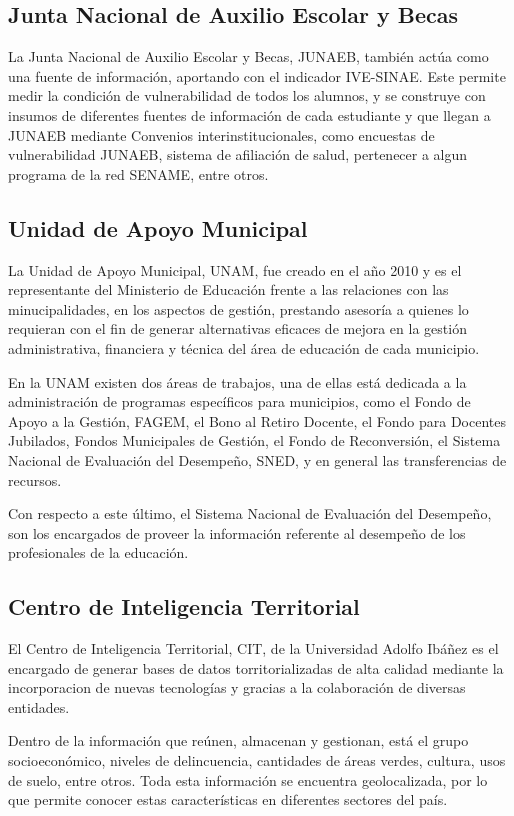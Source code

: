 \subsection{Junta Nacional de Auxilio Escolar y Becas}
La Junta Nacional de Auxilio Escolar y Becas, JUNAEB, también actúa como una fuente de información, aportando con el indicador IVE-SINAE. Este permite medir la condición de vulnerabilidad de todos los alumnos, y se construye con insumos de diferentes fuentes de información de cada estudiante y que llegan a JUNAEB mediante Convenios interinstitucionales, como encuestas de vulnerabilidad JUNAEB, sistema de afiliación de salud, pertenecer a algun programa de la red SENAME, entre otros. 

\subsection{Unidad de Apoyo Municipal}
La Unidad de Apoyo Municipal, UNAM, fue creado en el año 2010 y es el representante del Ministerio de Educación frente a las relaciones con las minucipalidades, en los aspectos de gestión, prestando asesoría a quienes lo requieran con el fin de generar alternativas eficaces de mejora en la gestión administrativa, financiera y técnica del área de educación de cada municipio.

En la UNAM existen dos áreas de trabajos, una de ellas está dedicada a la administración de programas específicos para municipios, como el Fondo de Apoyo a la Gestión, FAGEM, el Bono al Retiro Docente, el Fondo para Docentes Jubilados, Fondos Municipales de Gestión, el Fondo de Reconversión, el Sistema Nacional de Evaluación del Desempeño, SNED, y en general las transferencias de recursos.  

Con respecto a este último, el Sistema Nacional de Evaluación del Desempeño, son los encargados de proveer la información referente al desempeño de los profesionales de la educación. 

\subsection{Centro de Inteligencia Territorial}
El Centro de Inteligencia Territorial, CIT, de la Universidad Adolfo Ibáñez es el encargado de generar bases de datos torritorializadas de alta calidad mediante la incorporacion de nuevas tecnologías y gracias a la colaboración de diversas entidades. 

Dentro de la información que reúnen, almacenan y gestionan, está el grupo socioeconómico, niveles de delincuencia, cantidades de áreas verdes, cultura, usos de suelo, entre otros. Toda esta información se encuentra geolocalizada, por lo que permite conocer estas características en diferentes sectores del país.